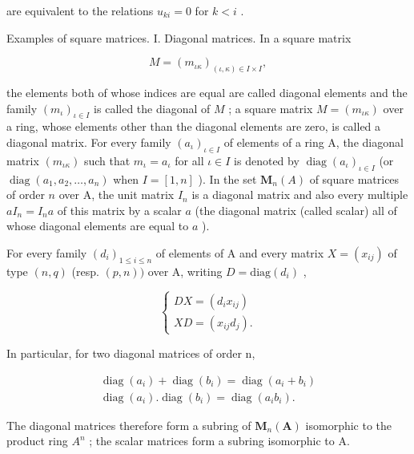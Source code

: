 are equivalent to the relations \(u_{ki} = 0\) for \(k < i\) .

Examples of square matrices. I. Diagonal matrices. In a square matrix

\[
M = \left(m _ {\iota \kappa}\right) _ {(\iota, \kappa) \in I \times I},
\]

the elements both of whose indices are equal are called diagonal elements and the family \((m_{\iota})_{\iota \in I}\) is called the diagonal of \(M\) ; a square matrix \(M = (m_{\iota \kappa})\) over a ring, whose elements other than the diagonal elements are zero, is called a diagonal matrix. For every family \((a_{\iota})_{\iota \in I}\) of elements of a ring A, the diagonal matrix \((m_{\iota \kappa})\) such that \(m_{\iota} = a_{\iota}\) for all \(\iota \in I\) is denoted by \(\operatorname{diag}(a_{\iota})_{\iota \in I}\) (or \(\operatorname{diag}(a_1, a_2, \ldots, a_n)\) when \(I = [1, n]\) ). In the set \(\mathbf{M}_n(A)\) of square matrices of order \(n\) over A, the unit matrix \(I_n\) is a diagonal matrix and also every multiple \(aI_n = I_na\) of this matrix by a scalar \(a\) (the diagonal matrix (called scalar) all of whose diagonal elements are equal to \(a\) ).

For every family \((d_i)_{1\leqslant i\leqslant n}\) of elements of A and every matrix \(X = (x_{ij})\) of type \((n,q)\) (resp. \((p,n))\) over A, writing \(D = \mathrm{diag}(d_i)\) ,

\[
\left\{ \begin{array}{l} D X = (d _ {i} x _ {i j}) \\ X D = (x _ {i j} d _ {j}). \end{array} \right.\tag{30}
\]

In particular, for two diagonal matrices of order n,

\[
\begin{array}{c} \operatorname{diag} (a _ {i}) + \operatorname{diag} (b _ {i}) = \operatorname{diag} (a _ {i} + b _ {i}) \\ \operatorname{diag} (a _ {i}). \operatorname{diag} (b _ {i}) = \operatorname{diag} (a _ {i} b _ {i}). \end{array}\tag{31}
\]

The diagonal matrices therefore form a subring of \(\mathbf{M}_{n}(\mathbf{A})\) isomorphic to the product ring \(A^{n}\) ; the scalar matrices form a subring isomorphic to A.

